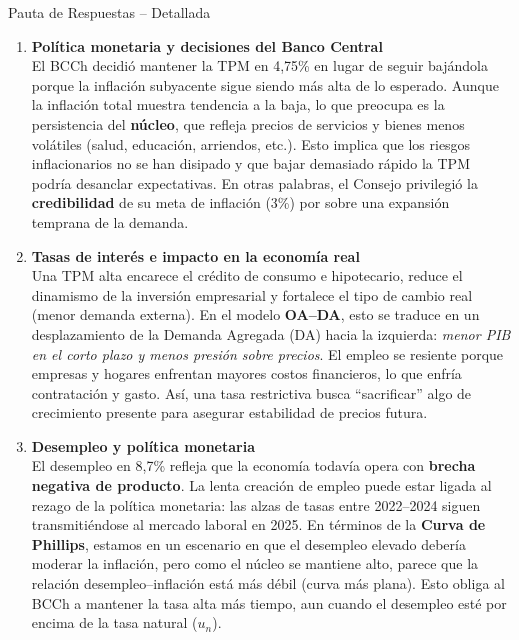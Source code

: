\documentclass[11pt,addpoints]{article}
\begin{document}
\newpage %
\vspace*{0.1cm} %


\begin{frame}{Pauta de Respuestas -- Detallada}
\begin{enumerate}[label=(\alph*),leftmargin=*]

\item \textbf{Política monetaria y decisiones del Banco Central} \\
El BCCh decidió mantener la TPM en 4,75\% en lugar de seguir bajándola porque la inflación subyacente sigue siendo más alta de lo esperado.  
Aunque la inflación total muestra tendencia a la baja, lo que preocupa es la persistencia del \textbf{núcleo}, que refleja precios de servicios y bienes menos volátiles (salud, educación, arriendos, etc.).  
Esto implica que los riesgos inflacionarios no se han disipado y que bajar demasiado rápido la TPM podría desanclar expectativas.  
En otras palabras, el Consejo privilegió la \textbf{credibilidad} de su meta de inflación (3\%) por sobre una expansión temprana de la demanda.

\item \textbf{Tasas de interés e impacto en la economía real} \\
Una TPM alta encarece el crédito de consumo e hipotecario, reduce el dinamismo de la inversión empresarial y fortalece el tipo de cambio real (menor demanda externa).  
En el modelo \textbf{OA--DA}, esto se traduce en un desplazamiento de la Demanda Agregada (DA) hacia la izquierda: \emph{menor PIB en el corto plazo y menos presión sobre precios}.  
El empleo se resiente porque empresas y hogares enfrentan mayores costos financieros, lo que enfría contratación y gasto.  
Así, una tasa restrictiva busca “sacrificar” algo de crecimiento presente para asegurar estabilidad de precios futura.

\item \textbf{Desempleo y política monetaria} \\
El desempleo en 8,7\% refleja que la economía todavía opera con \textbf{brecha negativa de producto}.  
La lenta creación de empleo puede estar ligada al rezago de la política monetaria: las alzas de tasas entre 2022–2024 siguen transmitiéndose al mercado laboral en 2025.  
En términos de la \textbf{Curva de Phillips}, estamos en un escenario en que el desempleo elevado debería moderar la inflación, pero como el núcleo se mantiene alto, parece que la relación desempleo–inflación está más débil (curva más plana).  
Esto obliga al BCCh a mantener la tasa alta más tiempo, aun cuando el desempleo esté por encima de la tasa natural ($u_n$).


\end{enumerate}
\end{frame}
\end{document}
